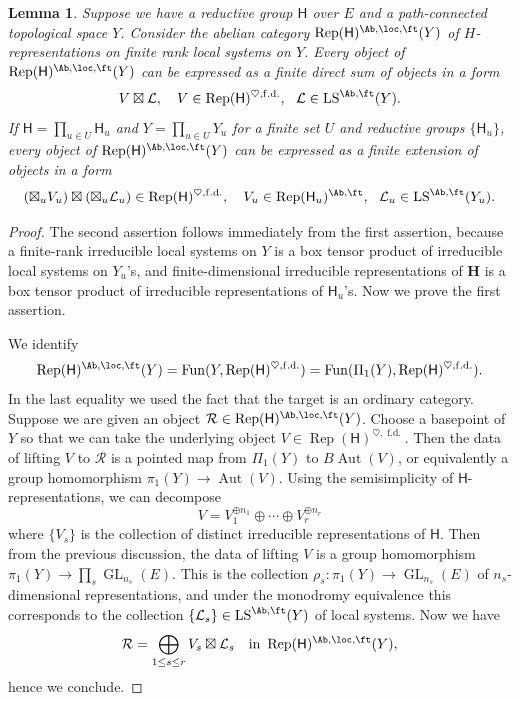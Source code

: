 \documentclass[10pt]{amsart}
\newtheorem{lemma}[subsubsection]{Lemma}
\theoremstyle{remark}
\newcommand{\te}{\text}
\newcommand{\on}{\operatorname}
\newcommand{\cL}{\mathcal{L}}
\newcommand{\Rep}{\on{Rep}}
\newcommand{\LS}{\on{LS}}
\newcommand{\Fun}{\on{Fun}}
\begin{document}
        \begin{lemma}\label{lem: Rep H Ab ft structure}
            Suppose we have a reductive group $\mathsf{H}$ over $E$ and a path-connected topological space $Y$. Consider the abelian category $\Rep(\mathsf{H})^{\Ab,\loc,\ft}(Y)$ of $H$-representations on finite rank local systems on $Y$. Every object of $\Rep(\mathsf{H})^{\Ab,\loc,\ft}(Y)$ can be expressed as a finite direct sum of objects in a form
            \[V\boxtimes \cL,\quad V\in\Rep(\mathsf{H})^{\heartsuit,\on{f.d.}}, \ \ \cL\in\LS^{\Ab,\ft}(Y).\]
            If $\mathsf{H}=\prod_{u\in U}\mathsf{H}_u$ and $Y=\prod_{u\in U} Y_u$ for a finite set $U$ and reductive groups $\{\mathsf{H}_u\}$, every object of $\Rep(\mathsf{H})^{\Ab,\loc,\ft}(Y)$ can be expressed as a finite extension of objects in a form
            \[(\boxtimes_u V_u)\boxtimes (\boxtimes_{u}\cL_u)\in\Rep(\mathsf{H})^{\heartsuit,\on{f.d.}}, \quad V_u\in\Rep(\mathsf{H}_u)^{\Ab,\ft}, \ \ \cL_u\in\LS^{\Ab,\ft}(Y_u).\]
        \end{lemma}
        \begin{proof}
        The second assertion follows immediately from the first assertion, because a finite-rank irreducible local systems on $Y$ is a box tensor product of irreducible local systems on $Y_u$'s, and finite-dimensional irreducible representations of $\mathbf{H}$ is a box tensor product of irreducible representations of $\mathsf{H}_u$'s. Now we prove the first assertion.
        \medskip
        
        We identify
        \[\Rep(\mathsf{H})^{\Ab,\loc,\ft}(Y)=\Fun(Y, \Rep(\mathsf{H})^{\heartsuit,\on{f.d.}})=\Fun(\Pi_1(Y), \Rep(\mathsf{H})^{\heartsuit,\on{f.d.}}).\]
        In the last equality we used the fact that the target is an ordinary category. Suppose we are given an object $\mathcal{R}\in \Rep(\mathsf{H})^{\Ab,\loc,\ft}(Y)$. Choose a basepoint of $Y$ so that we can take the underlying object $V\in \Rep(\mathsf{H})^{\heartsuit,\on{f.d.}}$. Then the data of lifting $V$ to $\mathcal{R}$ is a pointed map from $\Pi_1(Y)$ to $B\on{Aut}(V)$, or equivalently a group homomorphism $\pi_1(Y)\rightarrow \on{Aut}(V)$. Using the semisimplicity of $\mathsf{H}$-representations, we can decompose
        \[V=V^{\oplus n_1}_1\oplus \cdots\oplus V^{\oplus n_r}_{r}\]
        where $\{V_s\}$ is the collection of distinct irreducible representations of $\mathsf{H}$. Then from the previous discussion, the data of lifting $V$ is a group homomorphism $\pi_1(Y)\rightarrow \prod_s \on{GL}_{n_s}(E)$. This is the collection 
        $\rho_s: \pi_1(Y)\rightarrow \on{GL}_{n_s}(E)$
        of $n_s$-dimensional representations, and under the monodromy equivalence this corresponds to the collection $\{\cL_s\}\in \LS^{\Ab,\ft}(Y)$ of local systems. Now we have
        \[\mathcal{R}=\bigoplus_{1\le s\le r} V_s\boxtimes \cL_s\quad \te{in } \Rep(\mathsf{H})^{\Ab,\loc,\ft}(Y),\]
        hence we conclude.
        \end{proof}
    
\end{document}

